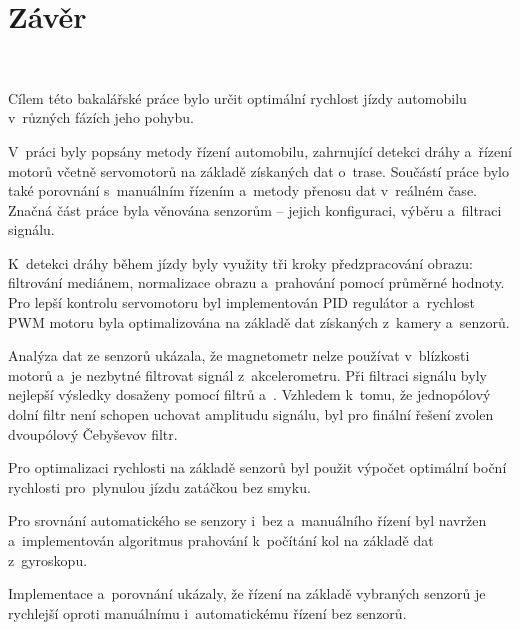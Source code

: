 \chapter{Závěr}
\label{sec:End}
\

Cílem této bakalářské práce bylo určit optimální rychlost jízdy automobilu v~různých
fázích jeho pohybu.

V~práci byly popsány metody řízení automobilu, zahrnující detekci dráhy a~řízení
motorů včetně servomotorů na základě získaných dat o~trase. Součástí práce bylo také
porovnání s~manuálním řízením a~metody přenosu dat v~reálném čase. Značná část práce
byla věnována senzorům – jejich konfiguraci, výběru a~filtraci signálu.

K~detekci dráhy během jízdy byly využity tři kroky předzpracování obrazu: filtrování
mediánem, normalizace obrazu a~prahování pomocí průměrné hodnoty. Pro lepší kontrolu
servomotoru byl implementován PID regulátor a~rychlost PWM motoru byla optimalizována
na základě dat získaných z~kamery a~senzorů.

Analýza dat ze senzorů ukázala, že magnetometr nelze používat v~blízkosti motorů a~je
nezbytné filtrovat signál z~akcelerometru. Při filtraci signálu byly nejlepší výsledky dosaženy
pomocí filtrů  a~. Vzhledem k~tomu,
že jednopólový dolní filtr není schopen uchovat amplitudu signálu, byl pro finální
řešení zvolen dvoupólový Čebyševov filtr.

Pro optimalizaci rychlosti na základě senzorů byl použit výpočet optimální boční
rychlosti pro~plynulou jízdu zatáčkou bez smyku.

Pro srovnání automatického se senzory i~bez a~manuálního řízení byl navržen a~implementován algoritmus
prahování k~počítání kol na základě dat z~gyroskopu.

Implementace a~porovnání ukázaly, že řízení na základě vybraných senzorů je rychlejší
oproti manuálnímu i~automatickému řízení bez senzorů.

\endinput
